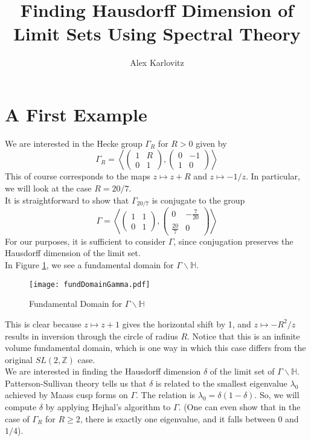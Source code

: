 \documentclass[]{article}
\title{Finding Hausdorff Dimension of Limit Sets Using Spectral Theory}
\author{Alex Karlovitz}
\date{}
\begin{document}
	
	\maketitle

\section{A First Example}

We are interested in the Hecke group $\Gamma_R$ for $R > 0$ given by
\[
	\Gamma_R = \left\langle
	\begin{pmatrix}
		1 & R \\
		0 & 1
	\end{pmatrix},
	\begin{pmatrix}
		0 & -1 \\
		1 & 0
	\end{pmatrix}
	\right\rangle
\]
This of course corresponds to the maps $z \mapsto z + R$ and $z \mapsto -1/z$.
In particular, we will look at the case $R = 20/7$.
\\

It is straightforward to show that $\Gamma_{20/7}$ is conjugate to the group
\[
	\Gamma = \left\langle
	\begin{pmatrix}
		1 & 1 \\
		0 & 1
	\end{pmatrix},
	\begin{pmatrix}
		0 & -\frac{7}{20} \\
		\frac{20}{7} & 0
	\end{pmatrix}
	\right\rangle
\]
For our purposes, it is sufficient to consider $\Gamma$, since conjugation preserves the Hausdorff dimension of the limit set.
\\

In Figure \ref{fundDomain}, we see a fundamental domain for $\Gamma\backslash\mathbb{H}$.
\begin{figure}[h]
	\centering
	\texttt{[image: fundDomainGamma.pdf]}
	\caption{Fundamental Domain for $\Gamma\backslash\mathbb{H}$}
	\label{fundDomain}
\end{figure}
This is clear because $z \mapsto z + 1$ gives the horizontal shift by 1, and $z \mapsto -R^2/z$ results in inversion through the circle of radius $R$.
Notice that this is an infinite volume fundamental domain, which is one way in which this case differs from the original $SL(2, \mathbb{Z})$ case.
\\

We are interested in finding the Hausdorff dimension $\delta$ of the limit set of $\Gamma\backslash\mathbb{H}$.
Patterson-Sullivan theory tells us that $\delta$ is related to the smallest eigenvalue $\lambda_0$ achieved by Maass cusp forms on $\Gamma$.
The relation is $\lambda_0 = \delta(1 - \delta)$.
So, we will compute $\delta$ by applying Hejhal's algorithm to $\Gamma$.
(One can even show that in the case of $\Gamma_R$ for $R \geq 2$, there is exactly one eigenvalue, and it falls between $0$ and $1/4$).
\\
\end{document}
